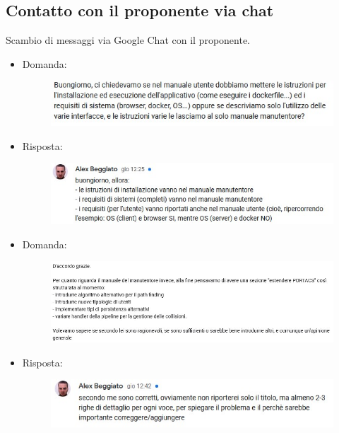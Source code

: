 \subsection{Contatto con il proponente via chat}
Scambio di messaggi via Google Chat con il proponente.
\begin{itemize}
	\item Domanda:
	\begin{figure}[H]
		\centering
		\includegraphics[scale=0.55]{res/images/screen0.jpg}
	\end{figure}	
	\item Risposta:
	\begin{figure}[H]
		\centering
		\includegraphics[scale=0.55]{res/images/screen1.jpg}
	\end{figure}		
	\item Domanda:
	\begin{figure}[H]
		\centering
		\includegraphics[scale=0.55]{res/images/screen3.jpg}
	\end{figure}
	\item Risposta:	
	\begin{figure}[H]
		\centering
		\includegraphics[scale=0.55]{res/images/screen2.jpg}
	\end{figure}
\end{itemize}



